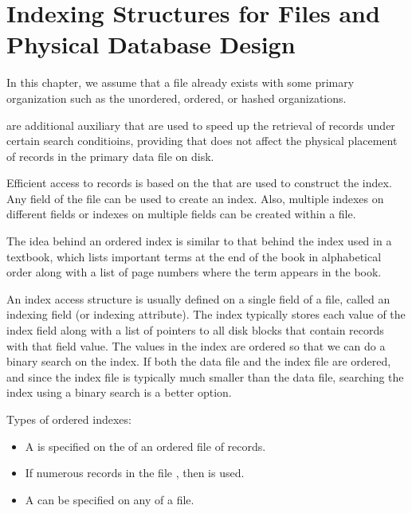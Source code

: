 \chapter{Indexing Structures for Files and Physical Database Design}

\par In this chapter, we assume that a file already exists with some primary organization such as the unordered, ordered, or hashed organizations.
\par {} are additional auxiliary  that are used to speed up the retrieval of records under certain search conditioins, providing  that does not affect the physical placement of records in the primary data file on disk.
\par Efficient access to records is based on the  that are used to construct the index. Any field of the file can be used to create an index. Also, multiple indexes on different fields or indexes on multiple fields can be created within a file.

  \par The idea behind an ordered index is similar to that behind the index used in a textbook, which lists important terms at the end of the book in alphabetical order along with a list of page numbers where the term appears in the book.
  \par An index access structure is usually defined on a single field of a file, called an indexing field (or indexing attribute). The index typically stores each value of the index field along with a list of pointers to all disk blocks that contain records with that field value. The values in the index are ordered so that we can do a binary search on the index. If both the data file and the index file are ordered, and since the index file is typically much smaller than the data file, searching the index using a binary search is a better option.
  \par Types of ordered indexes:
  \begin{itemize}
    \item A  is specified on the  of an ordered file of records.
    \item If numerous records in the file , then  is used.
    \item A  can be specified on any  of a file.
  \end{itemize}

